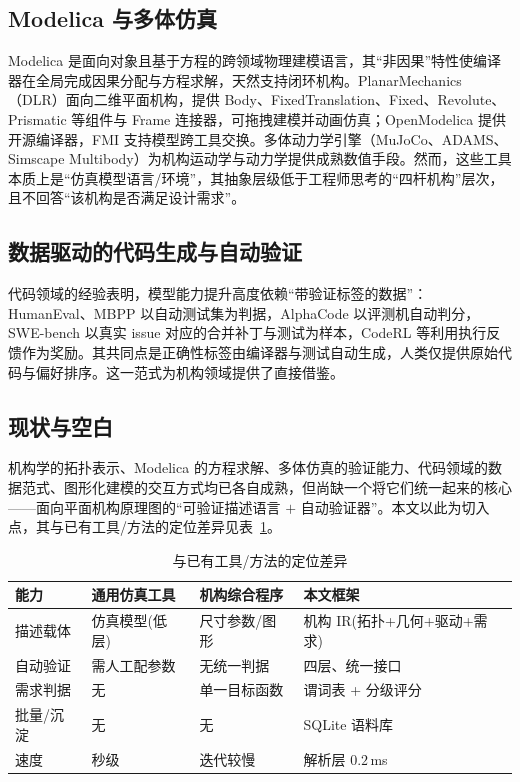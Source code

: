 \documentclass[UTF8,11pt,a4paper]{ctexart}
\begin{document}
\subsection{Modelica 与多体仿真}
Modelica 是面向对象且基于方程的跨领域物理建模语言，其``非因果''特性使编译器在全局完成因果分配与方程求解，天然支持闭环机构。PlanarMechanics（DLR）面向二维平面机构，提供 Body、FixedTranslation、Fixed、Revolute、Prismatic 等组件与 Frame 连接器，可拖拽建模并动画仿真；OpenModelica\cite{fritzson2020} 提供开源编译器，FMI\cite{fmi} 支持模型跨工具交换。多体动力学引擎（MuJoCo、ADAMS、Simscape Multibody）为机构运动学与动力学提供成熟数值手段。然而，这些工具本质上是``仿真模型语言/环境''，其抽象层级低于工程师思考的``四杆机构''层次，且不回答``该机构是否满足设计需求''。

\subsection{数据驱动的代码生成与自动验证}
代码领域的经验表明，模型能力提升高度依赖``带验证标签的数据''：HumanEval、MBPP 以自动测试集为判据，AlphaCode 以评测机自动判分，SWE-bench 以真实 issue 对应的合并补丁与测试为样本，CodeRL 等利用执行反馈作为奖励。其共同点是正确性标签由编译器与测试自动生成，人类仅提供原始代码与偏好排序。这一范式为机构领域提供了直接借鉴。

\subsection{现状与空白}
机构学的拓扑表示、Modelica 的方程求解、多体仿真的验证能力、代码领域的数据范式、图形化建模的交互方式均已各自成熟，但尚缺一个将它们统一起来的核心——面向平面机构原理图的``可验证描述语言 $+$ 自动验证器''。本文以此为切入点，其与已有工具/方法的定位差异见表~\ref{tab:diff}。

\begin{table}[htbp]
\centering
\caption{与已有工具/方法的定位差异}
\label{tab:diff}
\small
\begin{tabular}{p{2.4cm}p{3.2cm}p{3.2cm}p{4.4cm}}
\toprule
能力 & 通用仿真工具 & 机构综合程序 & 本文框架 \\
\midrule
描述载体 & 仿真模型(低层) & 尺寸参数/图形 & 机构 IR(拓扑+几何+驱动+需求) \\
自动验证 & 需人工配参数 & 无统一判据 & 四层、统一接口 \\
需求判据 & 无 & 单一目标函数 & 谓词表 + 分级评分 \\
批量/沉淀 & 无 & 无 & SQLite 语料库 \\
速度 & 秒级 & 迭代较慢 & 解析层 $0.2$\,ms \\
\bottomrule
\end{tabular}
\end{table}
\end{document}
